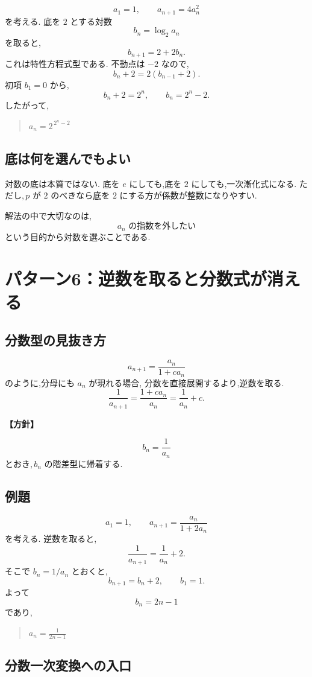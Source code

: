 \[
  a_1=1,\qquad a_{n+1}=4a_n^2
\]
を考える.
底を $2$ とする対数
\[
  b_n=\log_2a_n
\]
を取ると,
\[
  b_{n+1}=2+2b_n.
\]
これは特性方程式型である.
不動点は $-2$ なので,
\[
  b_n+2=2(b_{n-1}+2).
\]
初項 $b_1=0$ から,
\[
  b_n+2=2^n,
\qquad
  b_n=2^n-2.
\]
したがって,
\begin{quote}
  $a_n=2^{\,2^n-2}$
\end{quote}

\subsection{底は何を選んでもよい}

対数の底は本質ではない.
底を $e$ にしても,底を $2$ にしても,一次漸化式になる.
ただし,\,$p$ が $2$ のべきなら底を $2$ にする方が係数が整数になりやすい.

解法の中で大切なのは,
\[
  a_n\text{ の指数を外したい}
\]
という目的から対数を選ぶことである.

\section{パターン6：逆数を取ると分数式が消える}

\subsection{分数型の見抜き方}

\[
  a_{n+1}=\frac{a_n}{1+ca_n}
\]
のように,分母にも $a_n$ が現れる場合,
分数を直接展開するより,逆数を取る.
\[
  \frac1{a_{n+1}}
  =\frac{1+ca_n}{a_n}
  =\frac1{a_n}+c.
\]

\noindent\textbf{【方針】}

\[
  b_n=\frac1{a_n}
\]
とおき,\,$b_n$ の階差型に帰着する.

\subsection{例題}

\[
  a_1=1,\qquad
  a_{n+1}=\frac{a_n}{1+2a_n}
\]
を考える.
逆数を取ると,
\[
  \frac1{a_{n+1}}
  =\frac1{a_n}+2.
\]
そこで $b_n=1/a_n$ とおくと,
\[
  b_{n+1}=b_n+2,\qquad b_1=1.
\]
よって
\[
  b_n=2n-1
\]
であり,
\begin{quote}
  $a_n=\frac1{2n-1}$
\end{quote}

\subsection{分数一次変換への入口}

